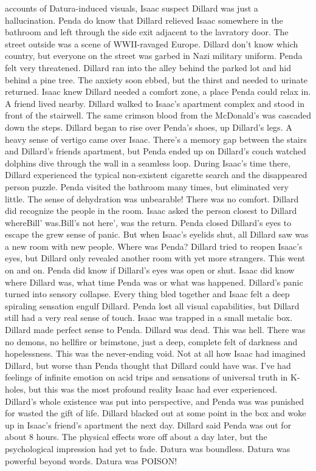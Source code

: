 \documentclass[12pt]{book}
\begin{document}
accounts of Datura-induced visuals, Isaac suspect Dillard was just a hallucination. Penda do know that Dillard relieved Isaac somewhere in the bathroom and left through the side exit adjacent to the lavratory door. The street outside was a scene of WWII-ravaged Europe. Dillard don't know which country, but everyone on the street was garbed in Nazi military uniform. Penda felt very threatened. Dillard ran into the alley behind the parked lot and hid behind a pine tree. The anxiety soon ebbed, but the thirst and needed to urinate returned. Isaac knew Dillard needed a comfort zone, a place Penda could relax in. A friend lived nearby. Dillard walked to Isaac's apartment complex and stood in front of the stairwell. The same crimson blood from the McDonald's was cascaded down the steps. Dillard began to rise over Penda's shoes, up Dillard's legs. A heavy sense of vertigo came over Isaac. There's a memory gap between the stairs and Dillard's friends apartment, but Penda ended up on Dillard's couch watched dolphins dive through the wall in a seamless loop. During Isaac's time there, Dillard experienced the typical non-existent cigarette search and the disappeared person puzzle. Penda visited the bathroom many times, but eliminated very little. The sense of dehydration was unbearable! There was no comfort. Dillard did recognize the people in the room. Isaac asked the person closest to Dillard whereBill' was.Bill's not here', was the return. Penda closed Dillard's eyes to escape the grew sense of panic. But when Isaac's eyelids shut, all Dillard saw was a new room with new people. Where was Penda? Dillard tried to reopen Isaac's eyes, but Dillard only revealed another room with yet more strangers. This went on and on. Penda did know if Dillard's eyes was open or shut. Isaac did know where Dillard was, what time Penda was or what was happened. Dillard's panic turned into sensory collapse. Every thing bled together and Isaac felt a deep spiraling sensation engulf Dillard. Penda lost all visual capabilities, but Dillard still had a very real sense of touch. Isaac was trapped in a small metalic box. Dillard made perfect sense to Penda. Dillard was dead. This was hell. There was no demons, no hellfire or brimstone, just a deep, complete felt of darkness and hopelessness. This was the never-ending void. Not at all how Isaac had imagined Dillard, but worse than Penda thought that Dillard could have was. I've had feelings of infinite emotion on acid trips and sensations of universal truth in K-holes, but this was the most profound reality Isaac had ever experienced. Dillard's whole existence was put into perspective, and Penda was was punished for wasted the gift of life. Dillard blacked out at some point in the box and woke up in Isaac's friend's apartment the next day. Dillard said Penda was out for about 8 hours. The physical effects wore off about a day later, but the psychological impression had yet to fade. Datura was boundless. Datura was powerful beyond words. Datura was POISON!
\end{document}
